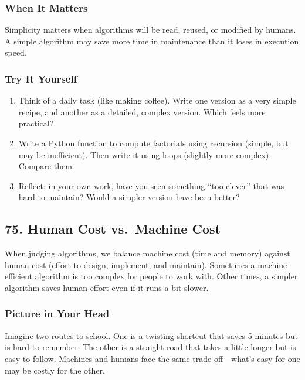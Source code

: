 \documentclass[
  letterpaper,
  DIV=11,
  numbers=noendperiod]{scrreprt}
\providecommand{\tightlist}{%
  \setlength{\itemsep}{0pt}\setlength{\parskip}{0pt}}
\begin{document}
\subsubsection{When It Matters}\label{when-it-matters-72}

Simplicity matters when algorithms will be read, reused, or modified by
humans. A simple algorithm may save more time in maintenance than it
loses in execution speed.

\subsubsection{Try It Yourself}\label{try-it-yourself-74}

\begin{enumerate}
\def\labelenumi{\arabic{enumi}.}
\tightlist
\item
  Think of a daily task (like making coffee). Write one version as a
  very simple recipe, and another as a detailed, complex version. Which
  feels more practical?
\item
  Write a Python function to compute factorials using recursion (simple,
  but may be inefficient). Then write it using loops (slightly more
  complex). Compare them.
\item
  Reflect: in your own work, have you seen something ``too clever'' that
  was hard to maintain? Would a simpler version have been better?
\end{enumerate}

\subsection{75. Human Cost vs.~Machine
Cost}\label{human-cost-vs.-machine-cost}

When judging algorithms, we balance machine cost (time and memory)
against human cost (effort to design, implement, and maintain).
Sometimes a machine-efficient algorithm is too complex for people to
work with. Other times, a simpler algorithm saves human effort even if
it runs a bit slower.

\subsubsection{Picture in Your Head}\label{picture-in-your-head-75}

Imagine two routes to school. One is a twisting shortcut that saves 5
minutes but is hard to remember. The other is a straight road that takes
a little longer but is easy to follow. Machines and humans face the same
trade-off---what's easy for one may be costly for the other.
\end{document}
